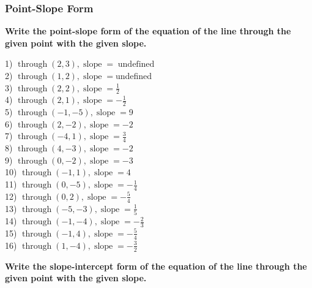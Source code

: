 \documentclass[12pt]{book}
\theoremstyle{definition}
\newcommand{\tmop}[1]{\ensuremath{\operatorname{#1}}}
\begin{document}
\subsubsection*{Point-Slope Form}
{\bf Write the point-slope form of the equation of the line through the given point with the given slope.}
\begin{multicols}{2}
  1) $\tmop{through} (2, 3), \tmop{slope} = \tmop{undefined}$\\
  2) $\tmop{through} (1, 2), \tmop{slope} =$undefined\\
  3) $\tmop{through} (2, 2), \tmop{slope} = \frac{1}{2}$\\
  4) $\tmop{through} (2, 1), \tmop{slope} = - \frac{1}{2}$\\
  5) $\tmop{through} (- 1, - 5), \tmop{slope} =$9\\
  6) $\tmop{through} (2, - 2), \tmop{slope} = - 2$\\
  7) $\tmop{through} (- 4, 1), \tmop{slope} = \frac{3}{4}$\\
  8) $\tmop{through} (4, - 3), \tmop{slope} = - 2$\\
  9) $\tmop{through} (0, - 2), \tmop{slope} = - 3$\\
  10) $\tmop{through} (- 1, 1), \tmop{slope} = 4$\\
  11) $\tmop{through} (0, - 5), \tmop{slope} = - \frac{1}{4}$\\
  12) $\tmop{through} (0, 2), \tmop{slope} = - \frac{5}{4}$\\
  13) $\tmop{through} (- 5, - 3), \tmop{slope} = \frac{1}{5}$\\
  14) $\tmop{through} (- 1, - 4), \tmop{slope} = - \frac{2}{3}$\\
  15) $\tmop{through} (- 1, 4), \tmop{slope} = - \frac{5}{4}$\\
  16) $\tmop{through} (1, - 4), \tmop{slope} = - \frac{3}{2}$
\end{multicols}
{\bf Write the slope-intercept form of the equation of the line through the given point with the given slope.}
\end{document}
